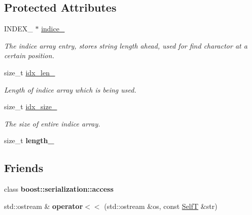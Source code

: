 \subsection*{Protected Attributes}
\begin{CompactItemize}
\item 
\hypertarget{classbbt__string_19e4ed626436244f89f0e3417a537ae0}{
INDEX\_\- $\ast$ \hyperlink{classbbt__string_19e4ed626436244f89f0e3417a537ae0}{indice\_\-}}
\label{classbbt__string_19e4ed626436244f89f0e3417a537ae0}

\begin{CompactList}\small\item\em The indice array entry, stores string length ahead, used for find charactor at a certain position. \item\end{CompactList}\item 
\hypertarget{classbbt__string_a5ecac8bf5090ed033b5c6f35d14ea16}{
size\_\-t \hyperlink{classbbt__string_a5ecac8bf5090ed033b5c6f35d14ea16}{idx\_\-len\_\-}}
\label{classbbt__string_a5ecac8bf5090ed033b5c6f35d14ea16}

\begin{CompactList}\small\item\em Length of indice array which is being used. \item\end{CompactList}\item 
\hypertarget{classbbt__string_725834ca784d8bc2b782e40bd3ddb384}{
size\_\-t \hyperlink{classbbt__string_725834ca784d8bc2b782e40bd3ddb384}{idx\_\-size\_\-}}
\label{classbbt__string_725834ca784d8bc2b782e40bd3ddb384}

\begin{CompactList}\small\item\em The size of entire indice array. \item\end{CompactList}\item 
\hypertarget{classbbt__string_f5e67157a9e7dfebf732abc370f86d65}{
size\_\-t \textbf{length\_\-}}
\label{classbbt__string_f5e67157a9e7dfebf732abc370f86d65}

\end{CompactItemize}
\subsection*{Friends}
\begin{CompactItemize}
\item 
\hypertarget{classbbt__string_c98d07dd8f7b70e16ccb9a01abf56b9c}{
class \textbf{boost::serialization::access}}
\label{classbbt__string_c98d07dd8f7b70e16ccb9a01abf56b9c}

\item 
\hypertarget{classbbt__string_9f77d965eac7a717e9124196d686e094}{
std::ostream \& \textbf{operator$<$$<$} (std::ostream \&os, const \hyperlink{classbbt__string}{SelfT} \&str)}
\label{classbbt__string_9f77d965eac7a717e9124196d686e094}

\end{CompactItemize}


